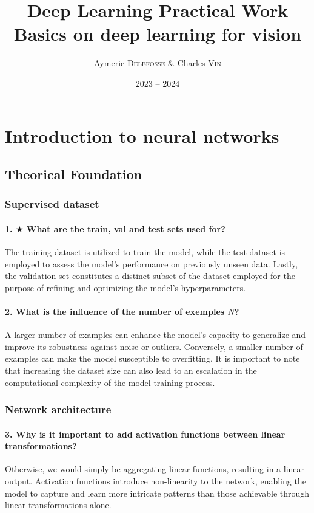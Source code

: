 \documentclass{article}
\title{
    Deep Learning Practical Work \\
    \Large \textbf{Basics on deep learning for vision}
}
\author{Aymeric \textsc{Delefosse} \& Charles \textsc{Vin}}
\date{2023 -- 2024}
\theoremstyle{plain}%
\theoremstyle{definition}
\theoremstyle{remark}
\begin{document}
\maketitle

\section{Introduction to neural networks}
\subsection{Theorical Foundation}
\subsubsection{Supervised dataset}
\paragraph{1. $\bigstar$ What are the train, val and test sets used for?}
The training dataset is utilized to train the model, while the test dataset is employed to assess the model's performance on previously unseen data. Lastly, the validation set constitutes a distinct subset of the dataset employed for the purpose of refining and optimizing the model's hyperparameters.

\paragraph{2. What is the influence of the number of exemples $N$?}
A larger number of examples can enhance the model's capacity to generalize and improve its robustness against noise or outliers. Conversely, a smaller number of examples can make the model susceptible to overfitting. It is important to note that increasing the dataset size can also lead to an escalation in the computational complexity of the model training process.

\subsubsection{Network architecture}
\paragraph{3. Why is it important to add activation functions between linear transformations?}
Otherwise, we would simply be aggregating linear functions, resulting in a linear output. Activation functions introduce non-linearity to the network, enabling the model to capture and learn more intricate patterns than those achievable through linear transformations alone.
\end{document}
